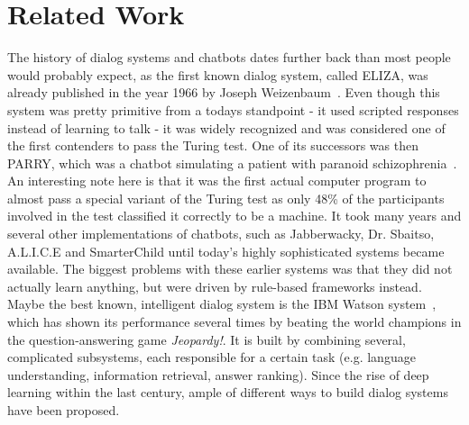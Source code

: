 \chapter{Related Work}
\label{related_work}

The history of dialog systems and chatbots dates further back than most people would probably expect, as the first known dialog system, called ELIZA, was already published in the year 1966 by Joseph Weizenbaum~\cite{Weizenbaum:1966}. Even though this system was pretty primitive from a todays standpoint - it used scripted responses instead of learning to talk - it was widely recognized and was considered one of the first contenders to pass the Turing test. One of its successors was then PARRY, which was a chatbot simulating a patient with paranoid schizophrenia~\cite{Colby:1974}. An interesting note here is that it was the first actual computer program to almost pass a special variant of the Turing test as only 48\% of the participants involved in the test classified it correctly to be a machine. It took many years and several other implementations of chatbots, such as Jabberwacky, Dr. Sbaitso, A.L.I.C.E and SmarterChild until today's highly sophisticated systems became available. The biggest problems with these earlier systems was that they did not actually learn anything, but were driven by rule-based frameworks instead. Maybe the best known, intelligent dialog system is the IBM Watson system~\cite{Ferrucci:2012}, which has shown its performance several times by beating the world champions in the question-answering game \emph{Jeopardy!}. It is built by combining several, complicated subsystems, each responsible for a certain task (e.g. language understanding, information retrieval, answer ranking). Since the rise of deep learning within the last century, ample of different ways to build dialog systems have been proposed.

